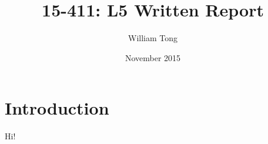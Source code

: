 \documentclass{article}
\title{15-411: L5 Written Report}
\author{William Tong}
\date{November 2015}
\begin{document}
\maketitle

\section{Introduction}

Hi!
\end{document}

